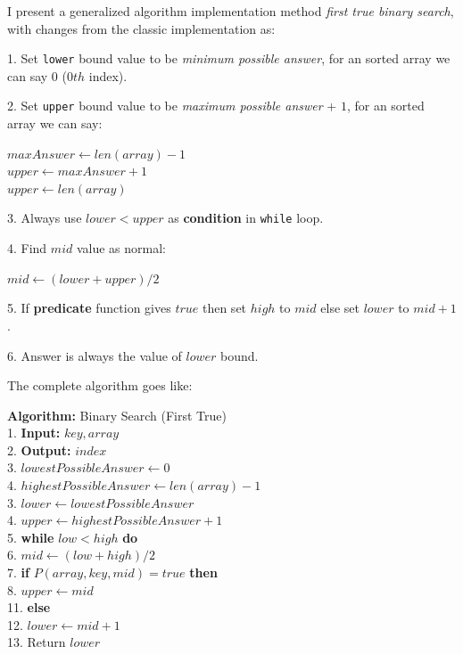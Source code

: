 \documentclass[10pt,twocolumn]{article}
\begin{document}
	I present a generalized algorithm implementation method \emph{first true binary search}, with changes from the classic implementation as:
	
	\vspace{5pt}
	
	1. Set \texttt{lower} bound value to be \emph{minimum possible answer}, for an sorted array we can say $0$ ($0th$ index).
	
	2. Set \texttt{upper} bound value to be \emph{maximum possible answer} + $1$, for an sorted array we can say:
	
	\begin{center}
		
	\quad \(maxAnswer \gets len(array) - 1\) \\
	\quad \(upper \gets maxAnswer + 1\) \\ 
	\quad \(upper \gets len(array)\) \\		
	
	
	\end{center}
	
	3. Always use $lower < upper$ as \textbf{condition} in \texttt{while} loop.
	
	4. Find \(mid\) value as normal:
	
	\begin{center}
		$mid \gets (lower + upper) / 2$
	\end{center}
	

	5. If \textbf{predicate} function gives $true$ then set \(high\)  to \(mid\) else set \(lower\) to \(mid + 1\).
	
	6. Answer is always the value of \(lower\) bound.
	
	\vspace*{5pt}
	
	The complete algorithm goes like:
	
	\vspace*{10pt}
	
	\noindent
	\textbf{Algorithm:} Binary Search (First True)\\
	1. \textbf{Input:} \(key, array\) \\
	2. \textbf{Output:} \(index\) \\
	3. \(lowestPossibleAnswer \gets 0\) \\
	4. \(highestPossibleAnswer \gets len(array) - 1\) \\
	3. \(lower \gets lowestPossibleAnswer\) \\
	4. \(upper \gets highestPossibleAnswer + 1\) \\
	5. \textbf{while} \(low < high\) \textbf{ do} \\
	6. \quad\(mid \gets (low + high) / 2\) \\
	7. \quad \textbf{if} \(P(array, key, mid) = true \) \textbf{ then} \\
	8. \quad \quad \(upper \gets mid\) \\
	11. \quad \textbf{else} \\
	12. \quad \quad \(lower \gets mid + 1\) \\
	13. Return \(lower\)
	
\end{document}
